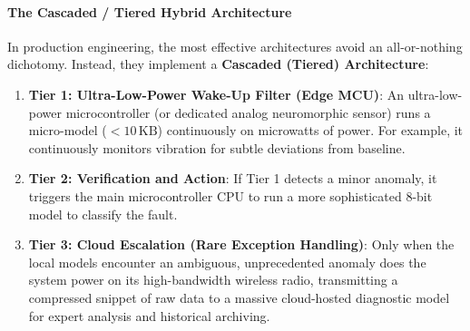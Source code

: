 \paragraph{The Cascaded / Tiered Hybrid Architecture}
In production engineering, the most effective architectures avoid an all-or-nothing dichotomy. Instead, they implement a \textbf{Cascaded (Tiered) Architecture}:
\begin{enumerate}
    \item \textbf{Tier 1: Ultra-Low-Power Wake-Up Filter (Edge MCU)}: An ultra-low-power microcontroller (or dedicated analog neuromorphic sensor) runs a micro-model ($< 10\,\text{KB}$) continuously on microwatts of power. For example, it continuously monitors vibration for subtle deviations from baseline.
    \item \textbf{Tier 2: Verification and Action}: If Tier 1 detects a minor anomaly, it triggers the main microcontroller CPU to run a more sophisticated 8-bit model to classify the fault.
    \item \textbf{Tier 3: Cloud Escalation (Rare Exception Handling)}: Only when the local models encounter an ambiguous, unprecedented anomaly does the system power on its high-bandwidth wireless radio, transmitting a compressed snippet of raw data to a massive cloud-hosted diagnostic model for expert analysis and historical archiving.
\end{enumerate}

